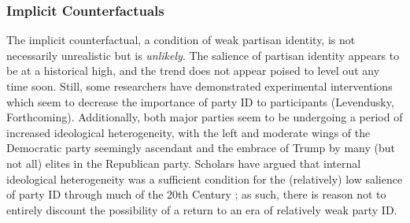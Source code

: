 \documentclass[12pt]{article}
\begin{document}
\subsubsection{Implicit Counterfactuals}
The implicit counterfactual, a condition of weak partisan identity, is not necessarily unrealistic but is \textit{unlikely}. The salience of partisan identity appears to be at a historical high, and the trend does not appear poised to level out any time soon. Still, some researchers have demonstrated experimental interventions which seem to decrease the importance of party ID to participants (Levendusky, Forthcoming). Additionally, both major parties seem to be undergoing a period of increased ideological heterogeneity, with the left and moderate wings of the Democratic party seemingly ascendant and the embrace of Trump by many (but not all) elites in the Republican party. Scholars have argued that internal ideological heterogeneity was a sufficient condition for the (relatively) low salience of party ID through much of the 20th Century \citep{rohde1991parties}; as such, there is reason not to entirely discount the possibility of a return to an era of relatively weak party ID.


\end{document}
